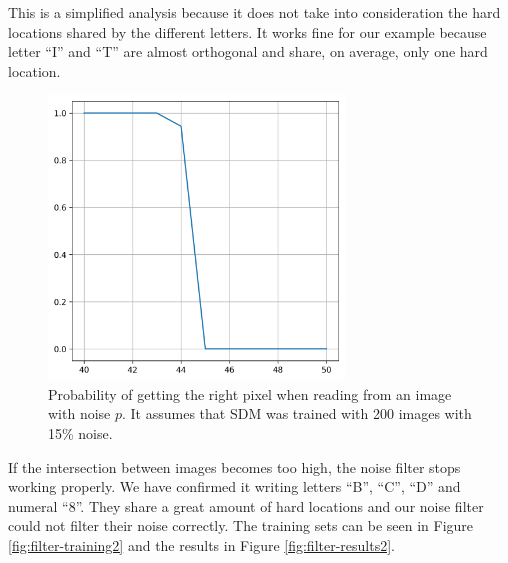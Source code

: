 This is a simplified analysis because it does not take into consideration the hard locations shared by the different letters. It works fine for our example because letter ``I'' and ``T'' are almost orthogonal and share, on average, only one hard location.

\begin{figure}[!htb]
\centering\includegraphics[width=0.7\textwidth]{./images02/filter/prob-right-pixel.png}
\caption{Probability of getting the right pixel when reading from an image with noise $p$. It assumes that SDM was trained with 200 images with 15\% noise.
\label{fig:filter-prob-right-pixel}
}
\end{figure}

If the intersection between images becomes too high, the noise filter stops working properly. We have confirmed it writing letters ``B'', ``C'', ``D'' and numeral ``8''. They share a great amount of hard locations and our noise filter could not filter their noise correctly. The training sets can be seen in Figure \ref{fig:filter-training2} and the results in Figure \ref{fig:filter-results2}.

